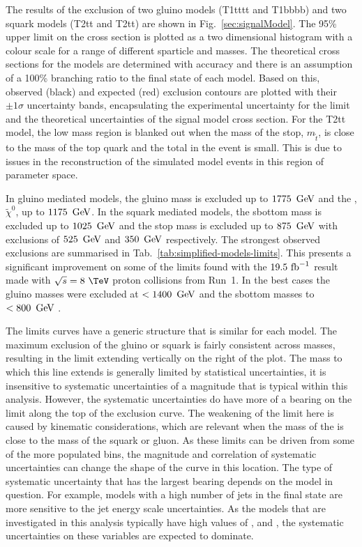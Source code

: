 The results of the exclusion of two gluino models (T1tttt and T1bbbb)
and two squark models (T2tt and T2tt) are shown in
Fig.~\ref{sec:signalModel}. The 95\% \CL upper limit on the cross
section is plotted as a two dimensional histogram with a colour scale
for a range of different sparticle and \LSP masses. The theoretical
cross sections for the models are determined with \NLO
accuracy and there is an assumption of a 100\% branching ratio to the
final state of each model. Based on this, observed (black) and
expected (red) exclusion contours are plotted with their $\pm1\sigma$
uncertainty bands, encapsulating the experimental uncertainty for the
limit and the theoretical uncertainties of the signal model cross
section. For the T2tt model, the low mass region is blanked out when
the mass of the stop, $m_{\tilde{t}}$, is close to the mass of the top
quark and the total \MET in the event is small. This is due to issues
in the \MET reconstruction of the simulated \SUSY model events in this
region of parameter space.

In gluino mediated models, the gluino mass is excluded up to 
$1775~\mathrm{\,Ge\kern -0.1em V}$ and the \LSP, $\tilde{\chi}^0$, up to $1175~\mathrm{\,Ge\kern -0.1em V}$. In the
squark mediated models, the sbottom mass is excluded up to $1025~\mathrm{\,Ge\kern -0.1em V}$
and the stop mass is excluded up to $875~\mathrm{\,Ge\kern -0.1em V}$ with \LSP exclusions of
$525~\mathrm{\,Ge\kern -0.1em V}$ and $350~\mathrm{\,Ge\kern -0.1em V}$ respectively. The strongest observed
exclusions are summarised in Tab.~\ref{tab:simplified-models-limits}.
This presents a significant improvement on some of the limits found
with the $19.5~\text{fb}^{-1}$ result made with $\sqrt{s}=8~\tev$ proton
collisions from Run~1. In the best cases the gluino masses were
excluded at $<1400~\mathrm{\,Ge\kern -0.1em V}$ and the sbottom masses to $<800~\mathrm{\,Ge\kern -0.1em V}$
\cite{smsTwiki}.

The limits curves have a generic structure that is similar for each
model. The maximum exclusion of the gluino or squark is fairly
consistent across \LSP masses, resulting in the limit extending
vertically on the
right of the plot. The mass to which this line extends is generally limited by
statistical uncertainties, it is insensitive to systematic uncertainties
of a magnitude that is typical within this analysis. However, the
systematic uncertainties do have more of a bearing on the limit
along the top of the exclusion curve. The weakening of the limit here
is caused by kinematic considerations, which are relevant when the
mass of the \LSP is close to the mass of the squark or gluon. As these
limits can be driven from some of the more populated bins, the
magnitude and correlation of systematic uncertainties can change the
shape of the curve in this location. The type of systematic
uncertainty that has the largest bearing depends on the model in
question. For example, \SUSY models with a high number of jets in the final
state are more sensitive to the jet energy scale uncertainties. As
the \SUSY models that are investigated in this analysis typically have
high values of \nb, \nj and \MHT, the systematic uncertainties on
these variables are expected to dominate.

